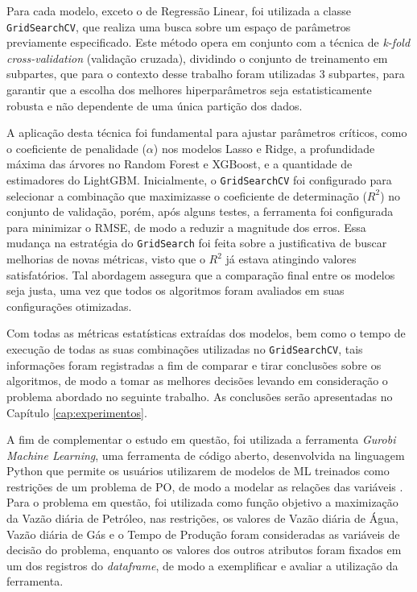 Para cada modelo, exceto o de Regressão Linear, foi utilizada a classe \texttt{GridSearchCV}, que realiza uma busca sobre um espaço de parâmetros previamente especificado. Este método opera em conjunto com a técnica de \textit{k-fold cross-validation} (validação cruzada), dividindo o conjunto de treinamento em subpartes, que para o contexto desse trabalho foram utilizadas 3 subpartes, para garantir que a escolha dos melhores hiperparâmetros seja estatisticamente robusta e não dependente de uma única partição dos dados. 

A aplicação desta técnica foi fundamental para ajustar parâmetros críticos, como o coeficiente de penalidade ($\alpha$) nos modelos Lasso e Ridge, a profundidade máxima das árvores no Random Forest e XGBoost, e a quantidade de estimadores do LightGBM. Inicialmente, o \texttt{GridSearchCV} foi configurado para selecionar a combinação que maximizasse o coeficiente de determinação ($R^2$) no conjunto de validação, porém, após alguns testes, a ferramenta foi configurada para minimizar o \gls{RMSE}, de modo a reduzir a magnitude dos erros. Essa mudança na estratégia do \texttt{GridSearch} foi feita sobre a justificativa de buscar melhorias de novas métricas, visto que o $R^2$ já estava atingindo valores satisfatórios. Tal abordagem assegura que a comparação final entre os modelos seja justa, uma vez que todos os algoritmos foram avaliados em suas configurações otimizadas.

Com todas as métricas estatísticas extraídas dos modelos, bem como o tempo de execução de todas as suas combinações utilizadas no \texttt{GridSearchCV}, tais informações foram registradas a fim de comparar e tirar conclusões sobre os algoritmos, de modo a tomar as melhores decisões levando em consideração o problema abordado no seguinte trabalho. As conclusões serão apresentadas no Capítulo \ref{cap:experimentos}.

A fim de complementar o estudo em questão, foi utilizada a ferramenta \textit{Gurobi Machine Learning}, uma ferramenta de código aberto, desenvolvida na linguagem Python que permite os usuários utilizarem de modelos de \gls{ML} treinados como restrições de um problema de \gls{PO}, de modo a modelar as relações das variáveis \cite{gurobiml}. Para o problema em questão, foi utilizada como função objetivo a maximização da Vazão diária de Petróleo, nas restrições, os valores de Vazão diária de Água, Vazão diária de Gás e o Tempo de Produção foram consideradas as variáveis de decisão do problema, enquanto os valores dos outros atributos foram fixados em um dos registros do \textit{dataframe}, de modo a exemplificar e avaliar a utilização da ferramenta.
    
